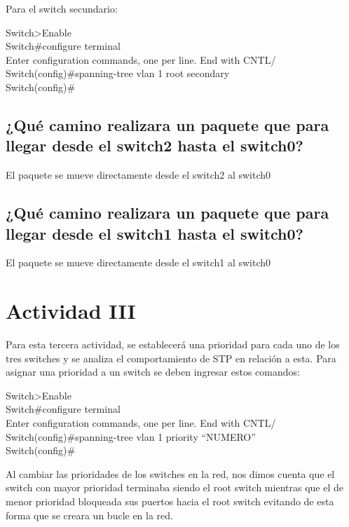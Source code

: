 \documentclass[spanish]{udpreport}
\begin{document}
Para el switch secundario:

\begin{flushleft}
	Switch>Enable \\
	Switch\#configure terminal\\
	Enter configuration commands, one per line. End with CNTL/\\
	Switch(config)\#spanning-tree vlan 1 root secondary\\
	Switch(config)\#\\
\end{flushleft}


\subsection{¿Qué camino realizara un paquete que para llegar desde el switch2 hasta el switch0?}
El paquete se mueve directamente desde el switch2 al switch0
\subsection{¿Qué camino realizara un paquete que para llegar desde el switch1 hasta el switch0?}
El paquete se mueve directamente desde el switch1 al switch0


\section{Actividad III}
Para esta tercera actividad, se establecerá una prioridad para cada uno de los tres switches y se analiza el comportamiento de STP en relación a esta. Para asignar una prioridad a un switch se deben ingresar estos comandos:

\begin{flushleft}	
	Switch>Enable\\
	Switch\#configure terminal\\
	Enter configuration commands, one per line. End with CNTL/\\
	Switch(config)\#spanning-tree vlan 1 priority “NUMERO”\\
	Switch(config)\#	\\
\end{flushleft}

Al cambiar las prioridades de los switches en la red, nos dimos cuenta que el switch con mayor prioridad terminaba siendo el root switch mientras que el de menor prioridad bloqueada sus puertos hacia el root switch evitando de esta forma que se creara un bucle en la red.
\end{document}
